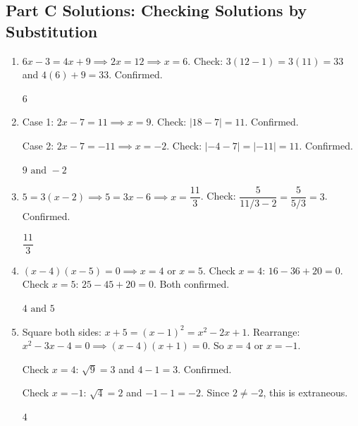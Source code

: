 \documentclass[14pt]{extarticle}
\begin{document}
\subsection*{Part C Solutions: Checking Solutions by Substitution}
\begin{enumerate}
  \item \(6x - 3 = 4x + 9 \implies 2x = 12 \implies x = 6\). Check: \(3(12 - 1) = 3(11) = 33\) and \(4(6) + 9 = 33\). Confirmed.

  \(\boxed{6}\)

  \item Case 1: \(2x - 7 = 11 \implies x = 9\). Check: \(|18 - 7| = 11\). Confirmed.

  Case 2: \(2x - 7 = -11 \implies x = -2\). Check: \(|-4 - 7| = |-11| = 11\). Confirmed.

  \(\boxed{9 \text{ and } -2}\)

  \item \(5 = 3(x - 2) \implies 5 = 3x - 6 \implies x = \dfrac{11}{3}\). Check: \(\dfrac{5}{11/3 - 2} = \dfrac{5}{5/3} = 3\). Confirmed.

  \(\boxed{\dfrac{11}{3}}\)

  \item \((x - 4)(x - 5) = 0 \implies x = 4\) or \(x = 5\). Check \(x = 4\): \(16 - 36 + 20 = 0\). Check \(x = 5\): \(25 - 45 + 20 = 0\). Both confirmed.

  \(\boxed{4 \text{ and } 5}\)

  \item Square both sides: \(x + 5 = (x - 1)^2 = x^2 - 2x + 1\). Rearrange: \(x^2 - 3x - 4 = 0 \implies (x - 4)(x + 1) = 0\). So \(x = 4\) or \(x = -1\).

  Check \(x = 4\): \(\sqrt{9} = 3\) and \(4 - 1 = 3\). Confirmed.

  Check \(x = -1\): \(\sqrt{4} = 2\) and \(-1 - 1 = -2\). Since \(2 \neq -2\), this is extraneous.

  \(\boxed{4}\)
\end{enumerate}
\end{document}

